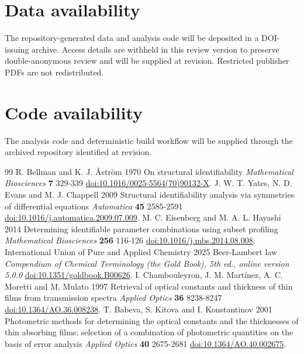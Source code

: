 \documentclass[12pt]{article}
\begin{document}
\section*{Data availability}
The repository-generated data and analysis code will be deposited in a DOI-issuing archive. Access details are withheld in this review version to preserve double-anonymous review and will be supplied at revision. Restricted publisher PDFs are not redistributed.
\section*{Code availability}
The analysis code and deterministic build workflow will be supplied through the archived repository identified at revision.

\begin{thebibliography}{99}
 R. Bellman and K. J. Åström 1970 On structural identifiability \textit{Mathematical Biosciences} \textbf{7} 329-339 \href{https://doi.org/10.1016/0025-5564(70)90132-X}{doi:10.1016/0025-5564(70)90132-X}.
 J. W. T. Yates, N. D. Evans and M. J. Chappell 2009 Structural identifiability analysis via symmetries of differential equations \textit{Automatica} \textbf{45} 2585-2591 \href{https://doi.org/10.1016/j.automatica.2009.07.009}{doi:10.1016/j.automatica.2009.07.009}.
 M. C. Eisenberg and M. A. L. Hayashi 2014 Determining identifiable parameter combinations using subset profiling \textit{Mathematical Biosciences} \textbf{256} 116-126 \href{https://doi.org/10.1016/j.mbs.2014.08.008}{doi:10.1016/j.mbs.2014.08.008}.
 International Union of Pure and Applied Chemistry 2025 Beer-Lambert law \textit{Compendium of Chemical Terminology (the Gold Book), 5th ed., online version 5.0.0} \href{https://doi.org/10.1351/goldbook.B00626}{doi:10.1351/goldbook.B00626}.
 I. Chambouleyron, J. M. Martínez, A. C. Moretti and M. Mulato 1997 Retrieval of optical constants and thickness of thin films from transmission spectra \textit{Applied Optics} \textbf{36} 8238-8247 \href{https://doi.org/10.1364/AO.36.008238}{doi:10.1364/AO.36.008238}.
 T. Babeva, S. Kitova and I. Konstantinov 2001 Photometric methods for determining the optical constants and the thicknesses of thin absorbing films: selection of a combination of photometric quantities on the basis of error analysis \textit{Applied Optics} \textbf{40} 2675-2681 \href{https://doi.org/10.1364/AO.40.002675}{doi:10.1364/AO.40.002675}.

\end{thebibliography}
\end{document}
